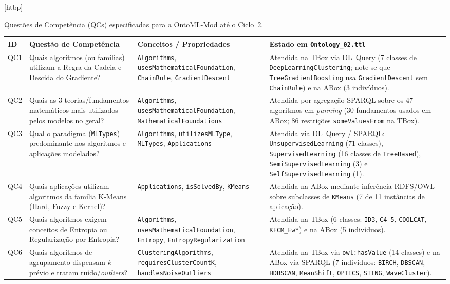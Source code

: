 \documentclass[11pt,a4paper]{article}
\makeatletter
\newcommand{\onto}[1]{\texttt{#1}}
\newcounter{quadro}
\newenvironment{quadro}{\@float{quadro}}{\end@float}
\makeatother
\begin{document}
\begin{quadro}[htbp]
\centering
\caption{Questões de Competência (QCs) especificadas para a OntoML-Mod até o Ciclo~2.}
\label{quad:qcs}
\footnotesize
\begin{tabularx}{\textwidth}{@{}p{0.8cm}>{\raggedright\arraybackslash}p{4.6cm}>{\raggedright\arraybackslash}p{4.5cm}>{\raggedright\arraybackslash}X@{}}
\toprule
\textbf{ID} & \textbf{Questão de Competência} & \textbf{Conceitos / Propriedades} & \textbf{Estado em \texttt{Ontology\_02.ttl}} \\
\midrule
QC1 & Quais algoritmos (ou famílias) utilizam a Regra da Cadeia e Descida do Gradiente? & \onto{Algorithms}, \onto{usesMathematicalFoundation}, \onto{ChainRule}, \onto{GradientDescent} & Atendida na TBox via DL~Query (7 classes de \onto{DeepLearningClustering}; note-se que \onto{TreeGradientBoosting} usa \onto{GradientDescent} sem \onto{ChainRule}) e na ABox (3 indivíduos). \\
\addlinespace[4pt]
QC2 & Quais as 3 teorias/fundamentos matemáticos mais utilizados pelos modelos no geral? & \onto{Algorithms}, \onto{usesMathematicalFoundation}, \onto{MathematicalFoundations} & Atendida por agregação SPARQL sobre os 47 algoritmos em \emph{punning} (30 fundamentos usados em ABox; 86 restrições \onto{someValuesFrom} na TBox). \\
\addlinespace[4pt]
QC3 & Qual o paradigma (\onto{MLTypes}) predominante nos algoritmos e aplicações modelados? & \onto{Algorithms}, \onto{utilizesMLType}, \onto{MLTypes}, \onto{Applications} & Atendida via DL~Query / SPARQL: \onto{UnsupervisedLearning} (71 classes), \onto{SupervisedLearning} (16 classes de \onto{TreeBased}), \onto{SemiSupervisedLearning} (3) e \onto{SelfSupervisedLearning} (1). \\
\addlinespace[4pt]
QC4 & Quais aplicações utilizam algoritmos da família K-Means (Hard, Fuzzy e Kernel)? & \onto{Applications}, \onto{isSolvedBy}, \onto{KMeans} & Atendida na ABox mediante inferência RDFS/OWL sobre subclasses de \onto{KMeans} (7 de 11 instâncias de aplicação). \\
\addlinespace[4pt]
QC5 & Quais algoritmos exigem conceitos de Entropia ou Regularização por Entropia? & \onto{Algorithms}, \onto{usesMathematicalFoundation}, \onto{Entropy}, \onto{EntropyRegularization} & Atendida na TBox (6 classes: \onto{ID3}, \onto{C4\_5}, \onto{COOLCAT}, \onto{KFCM\_Ew*}) e na ABox (5 indivíduos). \\
\addlinespace[4pt]
QC6 & Quais algoritmos de agrupamento dispensam $k$ prévio e tratam ruído/\emph{outliers}? & \onto{ClusteringAlgorithms}, \onto{requiresClusterCountK}, \onto{handlesNoiseOutliers} & Atendida na TBox via \onto{owl:hasValue} (14 classes) e na ABox via SPARQL (7 indivíduos: \onto{BIRCH}, \onto{DBSCAN}, \onto{HDBSCAN}, \onto{MeanShift}, \onto{OPTICS}, \onto{STING}, \onto{WaveCluster}). \\

\end{tabularx}
\end{quadro}
\end{document}
